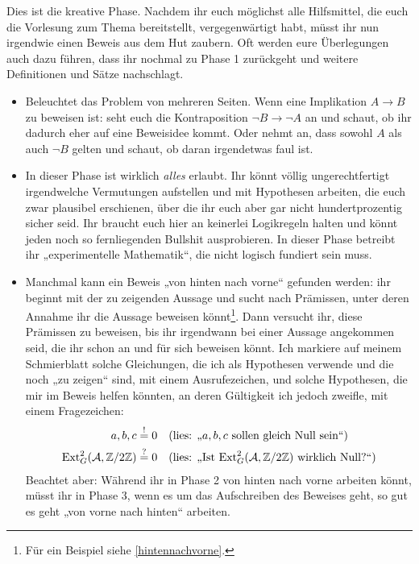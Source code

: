 \begin{phasetwo}[Rumprobieren]
    Dies ist die kreative Phase. Nachdem ihr euch möglichst alle Hilfsmittel, die euch die Vorlesung zum Thema bereitstellt, vergegenwärtigt habt, müsst ihr nun irgendwie einen Beweis aus dem Hut zaubern. Oft werden eure Überlegungen auch dazu führen, dass ihr nochmal zu Phase 1 zurückgeht und weitere Definitionen und Sätze nachschlagt.
    \begin{itemize}
        \item Beleuchtet das Problem von mehreren Seiten. Wenn eine Implikation $A\to B$ zu beweisen ist: seht euch die Kontraposition $\neg B\to \neg A$ an und schaut, ob ihr dadurch eher auf eine Beweisidee kommt. Oder nehmt an, dass sowohl $A$ als auch $\neg B$ gelten und schaut, ob daran irgendetwas faul ist.
        \item In dieser Phase ist wirklich \emph{alles} erlaubt. Ihr könnt völlig ungerechtfertigt irgendwelche Vermutungen aufstellen und mit Hypothesen arbeiten, die euch zwar plausibel erschienen, über die ihr euch aber gar nicht hundertprozentig sicher seid. Ihr braucht euch hier an keinerlei Logikregeln halten und könnt jeden noch so fernliegenden Bullshit ausprobieren. In dieser Phase betreibt ihr „experimentelle Mathematik“, die nicht logisch fundiert sein muss.
        \item Manchmal kann ein Beweis „von hinten nach vorne“ gefunden werden: ihr beginnt mit der zu zeigenden Aussage und sucht nach Prämissen, unter deren Annahme ihr die Aussage beweisen könnt\footnote{Für ein Beispiel siehe \cref{hintennachvorne}.}. Dann versucht ihr, diese Prämissen zu beweisen, bis ihr irgendwann bei einer Aussage angekommen seid, die ihr schon an und für sich beweisen könnt. Ich markiere auf meinem Schmierblatt solche Gleichungen, die ich als Hypothesen verwende und die noch „zu zeigen“ sind, mit einem Ausrufezeichen, und solche Hypothesen, die mir im Beweis helfen könnten, an deren Gültigkeit ich jedoch zweifle, mit einem Fragezeichen:
        \begin{align*}
            a,b,c & \stackrel{!}{=} 0 && (\text{lies: „$a,b,c$ sollen gleich Null sein“}) \\
            \mathrm{Ext}^2_G(\mathcal A,\mathbb Z/2\mathbb Z) & \stackrel{?}{=} 0 && (\text{lies: „Ist $\mathrm{Ext}^2_G(\mathcal A,\mathbb Z/2\mathbb Z)$ wirklich Null?“})
        \end{align*}
        Beachtet aber: Während ihr in Phase 2 von hinten nach vorne arbeiten könnt, müsst ihr in Phase 3, wenn es um das Aufschreiben des Beweises geht, so gut es geht „von vorne nach hinten“ arbeiten.

\end{itemize}
\end{phasetwo}
